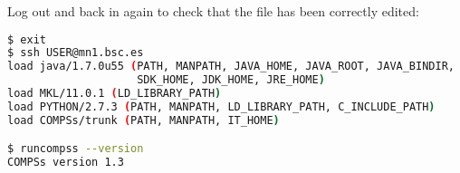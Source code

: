 Log out and back in again to check that the file has been correctly edited:
\begin{lstlisting}[language=bash]
$ exit
$ ssh USER@mn1.bsc.es
load java/1.7.0u55 (PATH, MANPATH, JAVA_HOME, JAVA_ROOT, JAVA_BINDIR, 
                    SDK_HOME, JDK_HOME, JRE_HOME)
load MKL/11.0.1 (LD_LIBRARY_PATH)
load PYTHON/2.7.3 (PATH, MANPATH, LD_LIBRARY_PATH, C_INCLUDE_PATH)
load COMPSs/trunk (PATH, MANPATH, IT_HOME)

$ runcompss --version
COMPSs version 1.3

\end{lstlisting}


